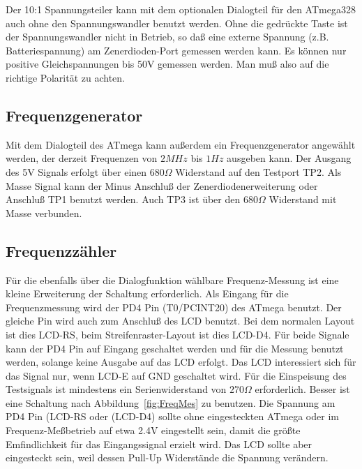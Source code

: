 Der 10:1 Spannungsteiler kann mit dem optionalen Dialogteil für den ATmega328 auch ohne 
den Spannungswandler benutzt werden. Ohne die gedrückte Taste ist der Spannungswandler nicht in 
Betrieb, so daß eine externe Spannung (z.B. Batteriespannung) am Zenerdioden-Port gemessen werden kann.
Es können nur positive Gleichspannungen bis 50V gemessen werden.
Man muß also auf die richtige Polarität zu achten.

\subsection{Frequenzgenerator}

Mit dem Dialogteil des ATmega kann außerdem ein Frequenzgenerator angewählt werden, der derzeit
Frequenzen von \(2 MHz\) bis \(1 Hz\) ausgeben kann. Der Ausgang des 5V Signals erfolgt über
einen \(680\Omega\) Widerstand auf den Testport TP2. Als Masse Signal kann der Minus Anschluß
der Zenerdiodenerweiterung oder Anschluß TP1 benutzt werden.
Auch TP3 ist über den \(680\Omega\) Widerstand mit Masse verbunden.

\subsection{Frequenzzähler}

Für die ebenfalls über die Dialogfunktion wählbare Frequenz-Messung ist eine kleine Erweiterung
der Schaltung erforderlich. Als Eingang für die Frequenzmessung wird der PD4 Pin (T0/PCINT20) des
ATmega benutzt. Der gleiche Pin wird auch zum Anschluß des LCD benutzt. Bei dem normalen Layout
ist dies LCD-RS, beim Streifenraster-Layout ist dies LCD-D4. Für beide Signale kann der PD4 Pin
auf Eingang geschaltet werden und für die Messung benutzt werden, solange keine Ausgabe auf das
LCD erfolgt. Das LCD interessiert sich für das Signal nur, wenn LCD-E auf GND geschaltet wird.
Für die Einspeisung des Testsignals ist mindestens ein Serienwiderstand von \(270\Omega\) erforderlich.
Besser ist eine Schaltung nach Abbildung~\ref{fig:FreqMes} zu benutzen. Die Spannung am PD4 Pin (LCD-RS oder
(LCD-D4) sollte ohne eingesteckten ATmega oder im Frequenz-Meßbetrieb auf etwa 2.4V eingestellt sein,
damit die größte Emfindlichkeit für das Eingangssignal erzielt wird. Das LCD sollte aber eingesteckt sein,
weil dessen Pull-Up Widerstände die Spannung verändern.


